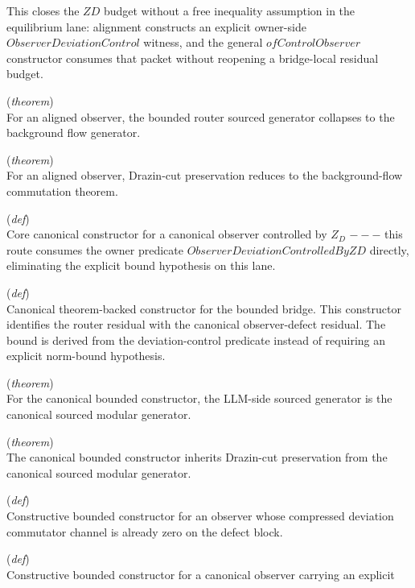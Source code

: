 \documentclass[11pt,a4paper]{article}
\begin{document}
\begin{description}
This closes the $ZD$ budget without a free inequality assumption in the 
equilibrium lane: alignment constructs an explicit owner-side 
$ObserverDeviationControl$ witness, and the general $ofControlObserver$ 
constructor consumes that packet without reopening a bridge-local residual 
budget.
  \item[\texttt{ofAlignedObserver\_sourcedGenerator\_eq\_flow}] (\textit{theorem}) \\ For an aligned observer, the bounded router sourced generator collapses to the 
background flow generator.
  \item[\texttt{ofAlignedObserver\_sourcedGenerator\_respects\_cut}] (\textit{theorem}) \\ For an aligned observer, Drazin-cut preservation reduces to the background-flow 
commutation theorem.
  \item[\texttt{ofCanonicalControlledObserver}] (\textit{def}) \\ Core canonical constructor for a canonical observer controlled by $Z_D$ $---$ this route 
consumes the owner predicate $ObserverDeviationControlledByZD$ directly, eliminating 
the explicit bound hypothesis on this lane.
  \item[\texttt{ofCanonicalObserverDefect}] (\textit{def}) \\ Canonical theorem-backed constructor for the bounded bridge. 
This constructor identifies the router residual with the canonical observer-defect 
residual. The bound is derived from the deviation-control predicate instead of 
requiring an explicit norm-bound hypothesis.
  \item[\texttt{ofCanonicalObserverDefect\_sourcedGenerator\_eq\_canonical}] (\textit{theorem}) \\ For the canonical bounded constructor, the LLM-side sourced generator is the 
canonical sourced modular generator.
  \item[\texttt{ofCanonicalObserverDefect\_sourcedGenerator\_respects\_cut}] (\textit{theorem}) \\ The canonical bounded constructor inherits Drazin-cut preservation from the 
canonical sourced modular generator.
  \item[\texttt{ofCompressedDeviationZeroObserver}] (\textit{def}) \\ Constructive bounded constructor for an observer whose compressed deviation 
commutator channel is already zero on the defect block.
  \item[\texttt{ofControlObserver}] (\textit{def}) \\ Constructive bounded constructor for a canonical observer carrying an explicit 

\end{description}
\end{document}
